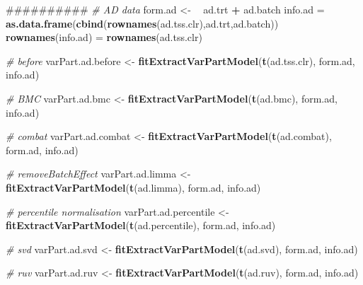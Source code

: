 \documentclass[]{book}
\newenvironment{Shaded}{\begin{snugshade}}{\end{snugshade}}
\newcommand{\KeywordTok}[1]{\textcolor[rgb]{0.13,0.29,0.53}{\textbf{#1}}}
\newcommand{\StringTok}[1]{\textcolor[rgb]{0.31,0.60,0.02}{#1}}
\newcommand{\CommentTok}[1]{\textcolor[rgb]{0.56,0.35,0.01}{\textit{#1}}}
\newcommand{\OperatorTok}[1]{\textcolor[rgb]{0.81,0.36,0.00}{\textbf{#1}}}
\newcommand{\ErrorTok}[1]{\textcolor[rgb]{0.64,0.00,0.00}{\textbf{#1}}}
\newcommand{\NormalTok}[1]{#1}
\begin{document}
\begin{Shaded}
\begin{Highlighting}[]
\NormalTok{##########}
\CommentTok{# AD data}
\NormalTok{form.ad <-}\StringTok{ }\ErrorTok{~}\StringTok{ }\NormalTok{ad.trt }\OperatorTok{+}\StringTok{ }\NormalTok{ad.batch}
\NormalTok{info.ad =}\StringTok{ }\KeywordTok{as.data.frame}\NormalTok{(}\KeywordTok{cbind}\NormalTok{(}\KeywordTok{rownames}\NormalTok{(ad.tss.clr),ad.trt,ad.batch))}
\KeywordTok{rownames}\NormalTok{(info.ad) =}\StringTok{ }\KeywordTok{rownames}\NormalTok{(ad.tss.clr)}

\CommentTok{# before}
\NormalTok{varPart.ad.before <-}\StringTok{ }\KeywordTok{fitExtractVarPartModel}\NormalTok{(}\KeywordTok{t}\NormalTok{(ad.tss.clr), form.ad, info.ad)}

\CommentTok{# BMC}
\NormalTok{varPart.ad.bmc <-}\StringTok{ }\KeywordTok{fitExtractVarPartModel}\NormalTok{(}\KeywordTok{t}\NormalTok{(ad.bmc), form.ad, info.ad)}

\CommentTok{# combat}
\NormalTok{varPart.ad.combat <-}\StringTok{ }\KeywordTok{fitExtractVarPartModel}\NormalTok{(}\KeywordTok{t}\NormalTok{(ad.combat), form.ad, info.ad)}

\CommentTok{# removeBatchEffect}
\NormalTok{varPart.ad.limma <-}\StringTok{ }\KeywordTok{fitExtractVarPartModel}\NormalTok{(}\KeywordTok{t}\NormalTok{(ad.limma), form.ad, info.ad)}

\CommentTok{# percentile normalisation}
\NormalTok{varPart.ad.percentile <-}\StringTok{ }\KeywordTok{fitExtractVarPartModel}\NormalTok{(}\KeywordTok{t}\NormalTok{(ad.percentile), form.ad, info.ad)}

\CommentTok{# svd}
\NormalTok{varPart.ad.svd <-}\StringTok{ }\KeywordTok{fitExtractVarPartModel}\NormalTok{(}\KeywordTok{t}\NormalTok{(ad.svd), form.ad, info.ad)}

\CommentTok{# ruv}
\NormalTok{varPart.ad.ruv <-}\StringTok{ }\KeywordTok{fitExtractVarPartModel}\NormalTok{(}\KeywordTok{t}\NormalTok{(ad.ruv), form.ad, info.ad)}



\end{Highlighting}
\end{Shaded}
\end{document}
